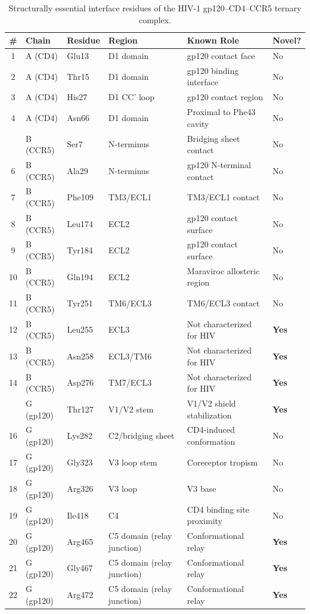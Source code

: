 \documentclass[11pt,a4paper]{article}
\begin{document}
\begin{table}[htbp]
\centering
\caption{Structurally essential interface residues of the HIV-1 gp120--CD4--CCR5 ternary complex.}
\label{tab:residues}
\small
\begin{tabular}{@{}clllll@{}}
\toprule
\# & Chain & Residue & Region & Known Role & Novel? \\
\midrule
1  & A (CD4)  & Glu13  & D1 domain       & gp120 contact face         & No \\
2  & A (CD4)  & Thr15  & D1 domain       & gp120 binding interface    & No \\
3  & A (CD4)  & His27  & D1 CC' loop     & gp120 contact region       & No \\
4  & A (CD4)  & Asn66  & D1 domain       & Proximal to Phe43 cavity   & No \\
\addlinespace
5  & B (CCR5) & Ser7   & N-terminus      & Bridging sheet contact     & No \\
6  & B (CCR5) & Ala29  & N-terminus      & gp120 N-terminal contact   & No \\
7  & B (CCR5) & Phe109 & TM3/ECL1        & TM3/ECL1 contact \citep{Tan2013}    & No \\
8  & B (CCR5) & Leu174 & ECL2            & gp120 contact surface      & No \\
9  & B (CCR5) & Tyr184 & ECL2            & gp120 contact surface      & No \\
10 & B (CCR5) & Gln194 & ECL2            & Maraviroc allosteric region & No \\
11 & B (CCR5) & Tyr251 & TM6/ECL3        & TM6/ECL3 contact \citep{Maeda2006}  & No \\
12 & B (CCR5) & Leu255 & ECL3            & Not characterized for HIV  & \textbf{Yes} \\
13 & B (CCR5) & Asn258 & ECL3/TM6        & Not characterized for HIV  & \textbf{Yes} \\
14 & B (CCR5) & Asp276 & TM7/ECL3        & Not characterized for HIV  & \textbf{Yes} \\
\addlinespace
15 & G (gp120) & Thr127 & V1/V2 stem     & V1/V2 shield stabilization & \textbf{Yes} \\
16 & G (gp120) & Lys282 & C2/bridging sheet & CD4-induced conformation & No \\
17 & G (gp120) & Gly323 & V3 loop stem   & Coreceptor tropism         & No \\
18 & G (gp120) & Arg326 & V3 loop        & V3 base                    & No \\
19 & G (gp120) & Ile418 & C4             & CD4 binding site proximity & No \\
20 & G (gp120) & Arg465 & C5 domain (relay junction) & Conformational relay    & \textbf{Yes} \\
21 & G (gp120) & Gly467 & C5 domain (relay junction) & Conformational relay    & \textbf{Yes} \\
22 & G (gp120) & Arg472 & C5 domain (relay junction) & Conformational relay    & \textbf{Yes} \\
\bottomrule
\end{tabular}
\end{table}
\end{document}

